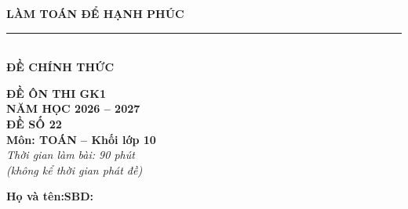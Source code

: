 \documentclass[12pt,a4paper]{article}
\begin{document}
\noindent
\begin{minipage}[c]{0.38\textwidth}
    \centering
    \textbf{LÀM TOÁN ĐỂ HẠNH PHÚC}\\[-2pt]
    \rule{3.2cm}{0.6pt}\\[4pt]
    \textbf{ĐỀ CHÍNH THỨC}
\end{minipage}\hfill
\begin{minipage}[c]{0.35\textwidth}
    \centering
    \textbf{ĐỀ ÔN THI GK1}\\
    \textbf{NĂM HỌC 2026 -- 2027}\\[2pt]
    \textbf{ĐỀ SỐ 22}\\
    \textbf{Môn: TOÁN -- Khối lớp 10}\\
    \textit{\small Thời gian làm bài: 90 phút\\(không kể thời gian phát đề)}
\end{minipage}

\vspace{0.15cm}
\noindent
\begin{minipage}[b]{0.78\textwidth}
    \textbf{Họ và tên:}\dotfill\textbf{SBD:}\makebox[3.5cm]{\dotfill}
\end{minipage}\hfill
\begin{minipage}[b]{0.20\textwidth}
    \hfill
    \setlength{\fboxrule}{0.8pt}%
\end{minipage}
\vspace{0.15cm}
\end{document}
